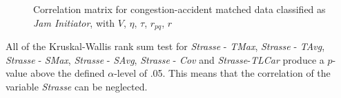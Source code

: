 \begin{figure}[!ht]
	\centering
	\caption{Correlation matrix for congestion-accident matched data classified as \textit{Jam Initiator}, with $V$, $\eta$, $\tau$, $r_{pq}$, $r$}
	\label{img:correlation_matrix_selected_initiator_cramers}
\end{figure}

All of the Kruskal-Wallis rank sum test for \textit{Strasse} - \textit{TMax}, \textit{Strasse} - \textit{TAvg}, \textit{Strasse} - \textit{SMax}, \textit{Strasse} - \textit{SAvg}, \textit{Strasse} - \textit{Cov} and \textit{Strasse}-\textit{TLCar} produce a $p$-value above the defined $\alpha$-level of .05. This means that the correlation of the variable \textit{Strasse} can be neglected.

